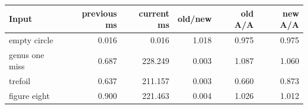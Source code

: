 \begin{center}
\small
\begin{tabular}{lrrrrr}
\toprule
Input & previous ms & current ms & old/new & old A/A & new A/A\\
\midrule
empty circle & 0.016 & 0.016 & 1.018 & 0.975 & 0.975\\
genus one miss & 0.687 & 228.249 & 0.003 & 1.087 & 1.060\\
trefoil & 0.637 & 211.157 & 0.003 & 0.660 & 0.873\\
figure eight & 0.900 & 221.463 & 0.004 & 1.026 & 1.012\\
\bottomrule
\end{tabular}
\end{center}
